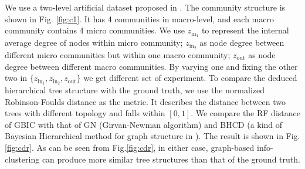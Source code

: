We use a two-level artificial dataset proposed in \cite{RN22}. 
The community structure is shown in Fig. \ref{fig:c1}. It has 4 communities in macro-level, and each macro community contains 4 micro communities. We use $z_{\mathrm{in}_1}$ to represent the internal average degree of nodes within micro community; $z_{\mathrm{in}_2}$ as node degree between different micro communities but within one macro community; $z_{\mathrm{out}}$ as node degree between different macro communities. By varying one and fixing the other two in $\{z_{\mathrm{in}_1}, z_{\mathrm{in}_2}, z_{\mathrm{out}} \}$ we get different set of experiment. To compare the deduced hierarchical tree structure with the ground truth, we use the normalized Robinson-Foulds distance as the metric. It describes the distance between two trees with different topology and falls within $[0,1]$. We compare the RF distance of GBIC with that of GN (Girvan-Newman algorithm) and BHCD (a kind of Bayesian Hierarchical method for graph structure in \cite{RN23}). The result is shown in Fig. \ref{fig:cdr}. As can be seen from Fig.\ref{fig:cdr}, in either case, graph-based info-clustering can produce more similar tree structures than that of the ground truth.
